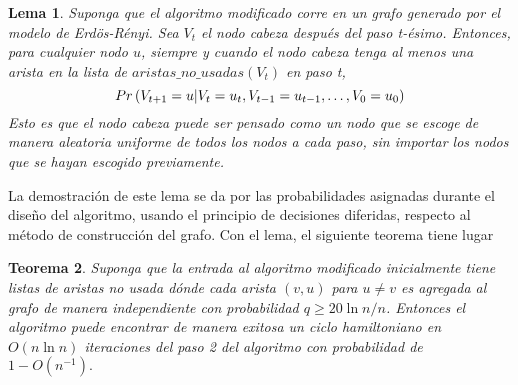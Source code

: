 \documentclass[12pt,letterpaper]{article}
\newtheorem{theorem}{Teorema}
\newtheorem{lemma}[theorem]{Lema}
\begin{document}
   \begin{lemma}
   	 Suponga que el algoritmo modificado corre en un grafo generado por el modelo de Erdös-Rényi. Sea $V_t$ el nodo cabeza después del paso t-ésimo. Entonces, para cualquier nodo $u$, siempre y cuando el nodo cabeza tenga al menos una arista en la lista de $aristas\_no\_usadas(V_t)$ en paso t,
   	\begin{equation*}
   	\mathnormal{Pr}\left(V_{t+1}=u | V_t =u_t, V_{t-1}=u_{t-1}, \dots, V_0=u_0\right)
   	\end{equation*}
   	Esto es que el nodo cabeza puede ser pensado como un nodo que se escoge de manera aleatoria uniforme de todos los nodos a cada paso, sin importar los nodos que se hayan escogido previamente. 
   \end{lemma}
	La demostración de este lema se da por las probabilidades asignadas durante el diseño del algoritmo, usando el principio de decisiones diferidas, respecto al método de construcción del grafo. 
  	Con el lema, el siguiente teorema tiene lugar 
  	\begin{theorem}
  		Suponga que la entrada al algoritmo modificado inicialmente tiene listas de aristas no usada dónde cada arista $(v,u)$ para $u\neq v$ es agregada al grafo de manera independiente con probabilidad $q \geq 20 \ln n / n$. Entonces el algoritmo puede encontrar de manera exitosa un ciclo hamiltoniano en $O(n\ln n)$ iteraciones del paso 2 del algoritmo con probabilidad de $1-O(n^{-1}).$
  	\end{theorem}
\end{document}
